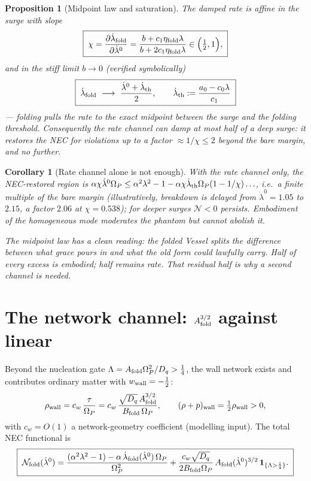 \documentclass[11pt,a4paper,oneside]{book}
\newcommand{\Op}{\Omega_P}
\newcommand{\note}[1]{\textcolor{black!65}{\emph{#1}}}
\newcommand{\Af}{A_{\rm fold}}
\newcommand{\Bf}{B_{\rm fold}}
\newcommand{\Dq}{D_q}
\newcommand{\ldz}{\dot\lambda^{0}}
\newcommand{\ldf}{\dot\lambda_{\rm fold}}
\newcommand{\NEC}{\mathcal N}
\theoremstyle{plain}
\newtheorem{proposition}{Proposition}[chapter]
\newtheorem{corollary}{Corollary}[chapter]
\theoremstyle{definition}
\theoremstyle{remark}
\begin{document}
\begin{proposition}[Midpoint law and saturation]\label{necrestoration:prop:midpoint}
The damped rate is affine in the surge with slope
\begin{equation}
\boxed{\;\chi=\frac{\partial\ldf}{\partial\ldz}
=\frac{b+c_1\eta_{\rm fold}\lambda}{b+2c_1\eta_{\rm fold}\lambda}\in\Bigl(\tfrac12,1\Bigr),\;}
\end{equation}
and in the stiff limit $b\to0$ (verified symbolically)
\begin{equation}
\boxed{\;\ldf\ \longrightarrow\ \frac{\ldz+\dot\lambda_{\rm th}}{2},
\qquad
\dot\lambda_{\rm th}:=\frac{a_0-c_0\lambda}{c_1}\;}
\end{equation}
--- folding pulls the rate to the exact \emph{midpoint} between the surge and the folding threshold.
Consequently the rate channel can damp at most half of a deep surge: it restores the NEC for violations
up to a factor $\approx1/\chi\le2$ beyond the bare margin, and no further.
\end{proposition}

\begin{corollary}[Rate channel alone is not enough]
With the rate channel only, the NEC-restored region is
$\alpha\chi\ldz\Op\le\alpha^2\lambda^2-1-\alpha\chi\dot\lambda_{\rm th}\Op(1-1/\chi)\ldots$, i.e.\ a
finite multiple of the bare margin (illustratively, breakdown is delayed from $\ldz=1.05$ to $2.15$, a
factor $2.06$ at $\chi=0.538$); for deeper surges $\NEC<0$ persists. Embodiment of the homogeneous mode
moderates the phantom but cannot abolish it.
\end{corollary}

\note{The midpoint law has a clean reading: the folded Vessel splits the difference between what grace
pours in and what the old form could lawfully carry. Half of every excess is embodied; half remains
rate. That residual half is why a second channel is needed.}

\section{The network channel: $\Af^{3/2}$ against linear}

Beyond the nucleation gate $\Lambda=\Af\Op^2/\Dq>\tfrac14$, the wall network exists and contributes
ordinary matter with $w_{\rm wall}=-\tfrac12$:
\begin{equation}
\rho_{\rm wall}=c_w\,\frac{\tau}{\Op}
=c_w\,\frac{\sqrt{\Dq}\,\Af^{3/2}}{\Bf\,\Op},
\qquad
(\rho+p)_{\rm wall}=\tfrac12\rho_{\rm wall}>0,
\end{equation}
with $c_w=O(1)$ a network-geometry coefficient (modelling input). The total NEC functional is
\begin{equation}\label{necrestoration:eq:total}
\boxed{\;\NEC_{\rm fold}(\ldz)
=\frac{(\alpha^2\lambda^2-1)-\alpha\,\ldf(\ldz)\,\Op}{\Op^{2}}
+\frac{c_w\sqrt{\Dq}}{2\Bf\Op}\,\Af(\ldz)^{3/2}\,
\mathbf 1_{\{\Lambda>\frac14\}}.\;}
\end{equation}
\end{document}

